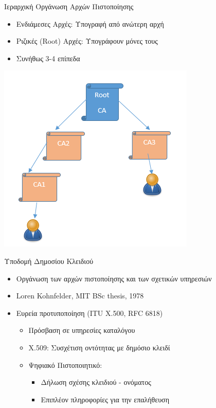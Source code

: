 \documentclass[handout]{beamer}
\begin{document}
\begin{frame}{Ιεραρχική Οργάνωση Αρχών Πιστοποίησης}
\begin{itemize} 
    \item Ενδιάμεσες Αρχές: Υπογραφή από ανώτερη αρχή 
    \item Ριζικές (Root) Αρχές: Υπογράφουν μόνες τους
    \item Συνήθως 3-4 επίπεδα
\end{itemize}
\begin{center}
\includegraphics[scale=0.5]{pki.PNG}
\end{center}
\end{frame}

\begin{frame}{Υποδομή Δημοσίου Κλειδιού}
\begin{itemize}
    \item Οργάνωση των αρχών πιστοποίησης και των σχετικών υπηρεσιών \pause
    \item Loren Kohnfelder, MIT BSc thesis, 1978 \pause
    \item Ευρεία προτυποποίηση (ITU X.500, RFC 6818)
    \begin{itemize}
        \item Πρόσβαση σε υπηρεσίες καταλόγου
        \item X.509: Συσχέτιση οντότητας με δημόσιο κλειδί
        \item Ψηφιακό Πιστοποιητικό: 
        \begin{itemize}
            \item Δήλωση σχέσης κλειδιού - ονόματος
            \item Επιπλέον πληροφορίες για την επαλήθευση
        \end{itemize}
    \end{itemize}    
\end{itemize}
\end{frame}
\end{document}

